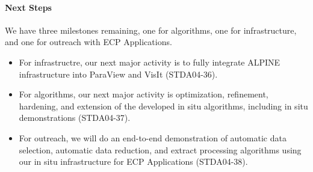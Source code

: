 \paragraph{Next Steps}

We have three milestones remaining, one for algorithms, one for infrastructure, and one for outreach with ECP Applications.
\begin{itemize}
        \setlength{\itemsep}{1pt}
        \setlength{\parskip}{0pt}
        \setlength{\parsep}{0pt}
\item For infrastructre, our next major activity is to fully integrate ALPINE infrastructure into ParaView and VisIt (STDA04-36).
\item For algorithms, our next major activity is optimization, refinement, hardening, and extension of the developed in situ algorithms, including in situ demonstrations (STDA04-37).
\item For outreach, we will do an end-to-end demonstration of automatic data selection, automatic data reduction, and extract processing algorithms using  our in situ infrastructure for ECP Applications (STDA04-38).
\end{itemize}
